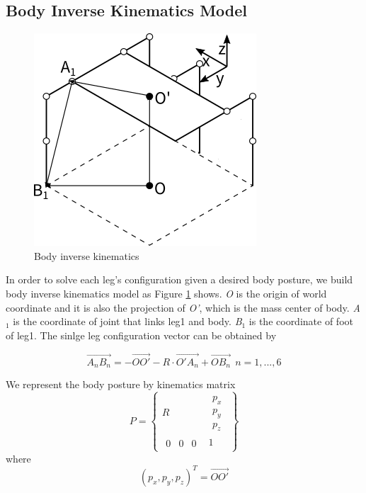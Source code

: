\documentclass[conference]{IEEEtran}
\begin{document}
\subsection{Body Inverse Kinematics Model}
\begin{figure}
    \centerline{\includegraphics{body_IK.png}}
    \caption{Body inverse kinematics}
    \label{fig1}
\end{figure}
In order to solve each leg's configuration given a desired body posture, we build body inverse kinematics model as Figure \ref{fig1} shows. \textit{O} is the origin of world coordinate and it is also the projection of \textit{O'}, which is the mass center of body. \textit{A$_{1}$} is the coordinate of joint that links leg1 and body. \textit{B$_{1}$} is the coordinate of foot of leg1. The sinlge leg configuration vector can be obtained by 

\begin{equation}\label{1}
    \overrightarrow{A_nB_n}= -\overrightarrow{OO'} - R \cdot \overrightarrow{O'A_n} + \overrightarrow{OB_n} \ \ n=1,...,6
\end{equation}
    
We represent the body posture by kinematics matrix 
\begin{equation}\label{3}
    P = \begin{Bmatrix}
           R & \begin{matrix}
                p_x \\ p_y \\ p_z
                \end{matrix} \\
        \begin{matrix}
        0 & 0 & 0 
        \end{matrix} & 1
        
    \end{Bmatrix}
\end{equation}
where \begin{equation} (p_x, p_y, p_z)^T = \overrightarrow{OO'}\end{equation}
\end{document}
